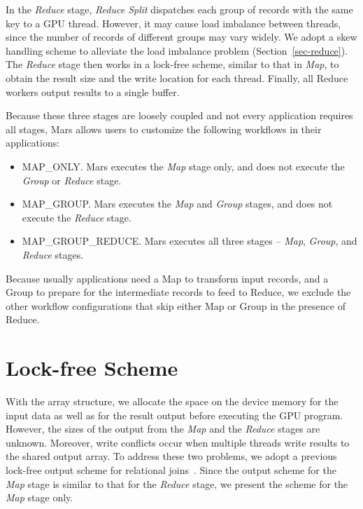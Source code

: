 

In the {\em Reduce} stage, {\em Reduce Split} dispatches each group of records
with the same key to a GPU thread.
However, it may cause load imbalance between threads, since the number of records of different groups may vary widely.
We adopt a skew handling scheme to alleviate the load imbalance problem (Section~\ref{sec-reduce}).
The {\em Reduce} stage then works in a lock-free scheme, similar to that in {\em Map}, to obtain the result size and the write location for each thread.
Finally, all Reduce workers output results to a single buffer.

Because these three stages are loosely coupled and not every application requires all
stages, Mars allows users to customize the following workflows in their applications:
\begin{itemize}
\item MAP\_ONLY. Mars executes the {\em Map} stage only, and does not execute the {\em Group} or {\em Reduce} stage.
\item MAP\_GROUP. Mars executes the {\em Map} and {\em Group} stages, and does not execute the {\em Reduce} stage.
\item MAP\_GROUP\_REDUCE.  Mars executes all three stages -- {\em Map}, {\em Group}, and {\em Reduce} stages.
\end{itemize}

Because usually applications need a Map to transform input records, and a Group to
prepare for the intermediate records to feed to Reduce, we exclude the other
workflow configurations that skip either Map or Group in the presence of Reduce.

\section{Lock-free Scheme} \label{sec-lockfree}

With the array structure, we allocate the space on the device memory
for the input data as well as for the result output before executing
the GPU program. However, the sizes of the output from the {\em Map} and
the {\em Reduce} stages are unknown. Moreover, write conflicts occur when
multiple threads write results to the shared output array. To
address these two problems, we adopt a previous lock-free output
scheme for relational joins~\cite{He2008a}. Since the output scheme
for the {\em Map} stage is similar to that for the {\em Reduce} stage, we
present the scheme for the {\em Map} stage only.

